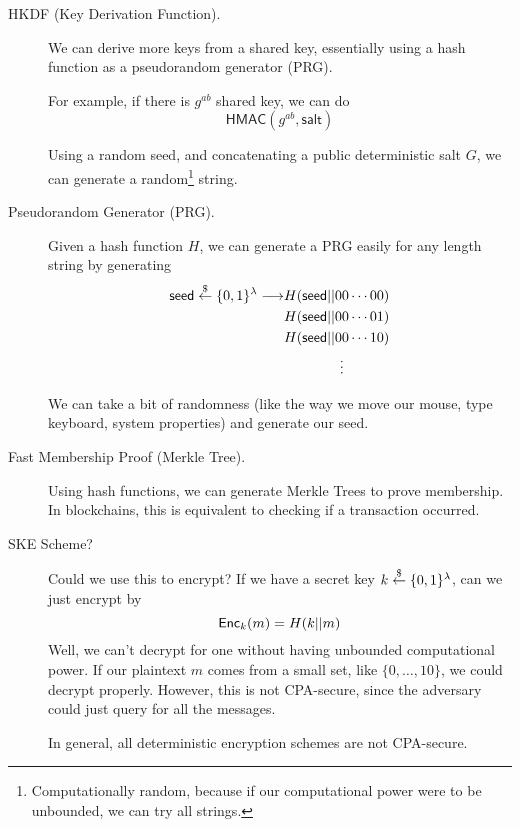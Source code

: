 \begin{description}
    \item[HKDF (Key Derivation Function).] We can derive more keys from a shared key, essentially using a hash function as a pseudorandom generator (PRG).

        For example, if there is $g^{ab}$ shared key, we can do
        \[\mathsf{HMAC}(g^{ab}, \textsf{salt})\]

        Using a random seed, and concatenating a public deterministic salt $G$, we can generate a random\footnote{Computationally random, because if our computational power were to be unbounded, we can try all strings.} string.


    \item[Pseudorandom Generator (PRG).] Given a hash function $H$, we can generate a PRG easily for any length string by generating
        \begin{align*}
            \mathsf{seed}\overset{\$}{\leftarrow} \{0, 1\}^\lambda \longrightarrow & H(\mathsf{seed}||00\cdots 00) \\
                                                                       & H(\mathsf{seed}||00\cdots 01) \\
                                                                       & H(\mathsf{seed}||00\cdots 10) \\
                                                                       & \qquad\qquad \vdots
        \end{align*}

        We can take a bit of randomness (like the way we move our mouse, type keyboard, system properties) and generate our seed.

    \item[Fast Membership Proof (Merkle Tree).] Using hash functions, we can generate Merkle Trees to prove membership. In blockchains, this is equivalent to checking if a transaction occurred.

    \item[SKE Scheme?] Could we use this to encrypt? If we have a secret key $k\overset{\$}{\leftarrow}\{0, 1\}^\lambda$, can we just encrypt by
        \[\operatorname{\mathsf{Enc}}_k(m) = H(k||m)\]
        Well, we can't decrypt for one without having unbounded computational power. If our plaintext $m$ comes from a small set, like $\{0, \dots, 10\}$, we could decrypt properly. However, this is not CPA-secure, since the adversary could just query for all the messages.

        \begin{remark}
            In general, all deterministic encryption schemes are not CPA-secure.
        \end{remark}
\end{description}

